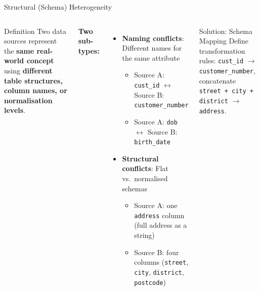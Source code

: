\documentclass[aspectratio=169,10pt]{beamer}
\begin{document}
\begin{frame}{Structural (Schema) Heterogeneity}
  \begin{columns}[T]
      \begin{block}{Definition}
        Two data sources represent the \textbf{same real-world concept} using \textbf{different table structures, column names, or normalisation levels}.
      \end{block}
      \vspace{6pt}
      \textbf{Two sub-types:}
      \begin{itemize}
        \item \textbf{Naming conflicts}: Different names for the same attribute
        \begin{itemize}
          \small
          \item Source A: \texttt{cust\_id} $\leftrightarrow$ Source B: \texttt{customer\_number}
          \item Source A: \texttt{dob} $\leftrightarrow$ Source B: \texttt{birth\_date}
        \end{itemize}
        \item \textbf{Structural conflicts}: Flat vs.\ normalised schemas
        \begin{itemize}
          \small
          \item Source A: one \texttt{address} column (full address as a string)
          \item Source B: four columns (\texttt{street}, \texttt{city}, \texttt{district}, \texttt{postcode})
        \end{itemize}
      \end{itemize}
      \vspace{4pt}
      \begin{exampleblock}{Solution: Schema Mapping}
        Define transformation rules: \texttt{cust\_id} $\to$ \texttt{customer\_number}, concatenate \texttt{street + city + district} $\to$ \texttt{address}.
      \end{exampleblock}


\end{columns}
\end{frame}
\end{document}
